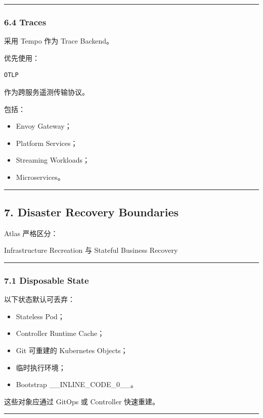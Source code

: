 \documentclass[11pt,a4paper]{article}
\begin{document}
\vspace{0.5em}\hrule\vspace{0.5em}
\subsubsection{6.4 Traces}
采用 Tempo 作为 Trace Backend。

优先使用：

\begin{lstlisting}[language=text]
OTLP
\end{lstlisting}
作为跨服务遥测传输协议。

包括：

\begin{itemize}
  \item Envoy Gateway；
  \item Platform Services；
  \item Streaming Workloads；
  \item Microservices。
\end{itemize}
\vspace{0.5em}\hrule\vspace{0.5em}
\subsection{7. Disaster Recovery Boundaries}
Atlas 严格区分：

\begin{gfmBlockquote}
Infrastructure Recreation
与
Stateful Business Recovery
\end{gfmBlockquote}
\vspace{0.5em}\hrule\vspace{0.5em}
\subsubsection{7.1 Disposable State}
以下状态默认可丢弃：

\begin{itemize}
  \item Stateless Pod；
  \item Controller Runtime Cache；
  \item Git 可重建的 Kubernetes Objects；
  \item 临时执行环境；
  \item Bootstrap \_\_INLINE\_CODE\_0\_\_。
\end{itemize}
这些对象应通过 GitOps 或 Controller 快速重建。

\vspace{0.5em}\hrule\vspace{0.5em}
\end{document}
